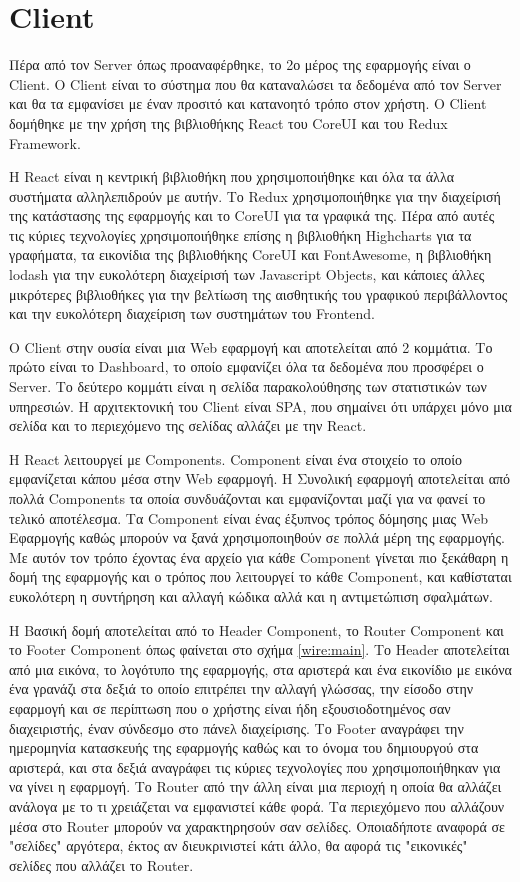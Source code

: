 \section{Client}
Πέρα από τον Server όπως προαναφέρθηκε, το 2ο μέρος της εφαρμογής είναι ο Client. Ο Client είναι το σύστημα που θα καταναλώσει τα δεδομένα από τον Server και θα τα εμφανίσει με έναν προσιτό και κατανοητό τρόπο στον χρήστη. Ο Client δομήθηκε με την χρήση της βιβλιοθήκης React του CoreUI και του Redux Framework.

Η React είναι η κεντρική βιβλιοθήκη που χρησιμοποιήθηκε και όλα τα άλλα συστήματα αλληλεπιδρούν με αυτήν. Το Redux χρησιμοποιήθηκε για την διαχείρισή της κατάστασης της εφαρμογής και το CoreUI για τα γραφικά της. Πέρα από αυτές τις κύριες τεχνολογίες χρησιμοποιήθηκε επίσης η βιβλιοθήκη Highcharts για τα γραφήματα, τα εικονίδια της βιβλιοθήκης CoreUI και FontAwesome, η βιβλιοθήκη lodash για την ευκολότερη διαχείρισή των Javascript Objects, και κάποιες άλλες μικρότερες βιβλιοθήκες για την βελτίωση της αισθητικής του γραφικού περιβάλλοντος και την ευκολότερη διαχείριση των συστημάτων του Frontend. 

Ο Client στην ουσία είναι μια Web εφαρμογή και αποτελείται από 2 κομμάτια. Το πρώτο είναι το Dashboard, το οποίο εμφανίζει όλα τα δεδομένα που προσφέρει ο Server. Το δεύτερο κομμάτι είναι η σελίδα παρακολούθησης των στατιστικών των υπηρεσιών. Η αρχιτεκτονική του Client είναι SPA, που σημαίνει ότι υπάρχει μόνο μια σελίδα και το περιεχόμενο της σελίδας αλλάζει με την React.

Η React λειτουργεί με Components. Component είναι ένα στοιχείο το οποίο εμφανίζεται κάπου μέσα στην Web εφαρμογή. Η Συνολική εφαρμογή αποτελείται από πολλά Components τα οποία συνδυάζονται και εμφανίζονται μαζί για να φανεί το τελικό αποτέλεσμα. Τα Component είναι ένας έξυπνος τρόπος δόμησης μιας Web Εφαρμογής καθώς μπορούν να ξανά χρησιμοποιηθούν σε πολλά μέρη της εφαρμογής. Με αυτόν τον τρόπο έχοντας ένα αρχείο για κάθε Component γίνεται πιο ξεκάθαρη η δομή της εφαρμογής και ο τρόπος που λειτουργεί το κάθε Component, και καθίσταται ευκολότερη η συντήρηση και αλλαγή κώδικα αλλά και η αντιμετώπιση σφαλμάτων. 

Η Βασική δομή αποτελείται από το Header Component, το Router Component και το Footer Component όπως φαίνεται στο σχήμα \ref{wire:main}. Το Header αποτελείται από μια εικόνα, το λογότυπο της εφαρμογής, στα αριστερά και ένα εικονίδιο με εικόνα ένα γρανάζι στα δεξιά το οποίο επιτρέπει την αλλαγή γλώσσας, την είσοδο στην εφαρμογή και σε περίπτωση που ο χρήστης είναι ήδη εξουσιοδοτημένος σαν διαχειριστής, έναν σύνδεσμο στο πάνελ διαχείρισης. Το Footer αναγράφει την ημερομηνία κατασκευής της εφαρμογής καθώς και το όνομα του δημιουργού στα αριστερά, και στα δεξιά αναγράφει τις κύριες τεχνολογίες που χρησιμοποιήθηκαν για να γίνει η εφαρμογή. Το Router από την άλλη είναι μια περιοχή η οποία θα αλλάζει ανάλογα με το τι χρειάζεται να εμφανιστεί κάθε φορά. Τα περιεχόμενο που αλλάζουν μέσα στο Router μπορούν να χαρακτηρησούν σαν σελίδες. Οποιαδήποτε αναφορά σε "σελίδες" αργότερα, έκτος αν διευκρινιστεί κάτι άλλο, θα αφορά τις "εικονικές" σελίδες που αλλάζει το Router.

